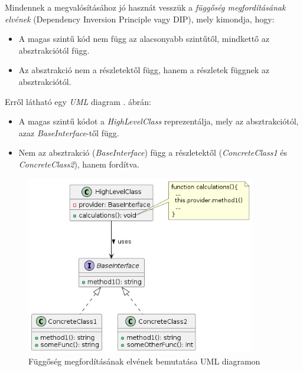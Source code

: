 \documentclass[
]{thesis-ekf}
\theoremstyle{definition}
\theoremstyle{remark}
\begin{document}
Mindennek a megvalósításához jó hasznát vesszük a \emph{függőség megfordításának elvének} (Dependency Inversion Principle vagy DIP), mely kimondja, hogy:
\begin{itemize}
	\item A magas szintű kód nem függ az alacsonyabb szintűtől, mindkettő az absztrakciótól függ.
	\item Az absztrakció nem a részletektől függ, hanem a részletek függnek az absztrakciótól.
\end{itemize}\cite{wiki-dip-magyar} 
Erről látható egy \emph{UML} diagram . ábrán:
\begin{itemize}
	\item A magas szintű kódot a \emph{HighLevelClass} reprezentálja, mely az absztrakciótól, azaz  \emph{BaseInterface}-től függ.
	\item Nem az absztrakció (\emph{BaseInterface}) függ a részletektől (\emph{ConcreteClass1} és \emph{ConcreteClass2}), hanem fordítva.
\end{itemize}

\begin{figure}[H]
	\centering
	\includegraphics[width=10cm]{images/dip-general.png}
	\caption[Függőség megfordításának elvének bemutatása UML diagramon]{Függőség megfordításának elvének bemutatása UML diagramon}
	\label{fig-dip-general}
\end{figure}
\end{document}
